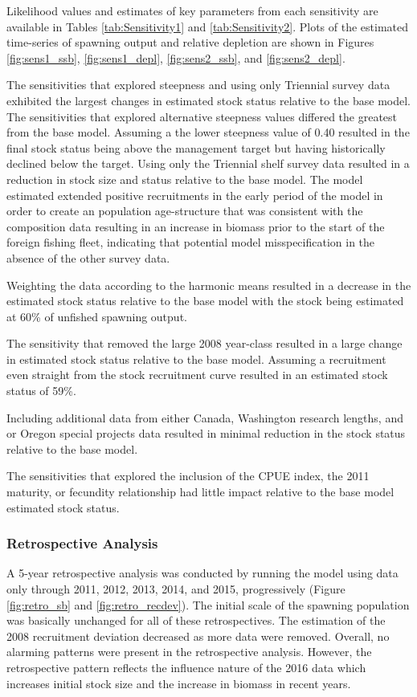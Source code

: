 \documentclass[12pt,]{article}
\begin{document}
Likelihood values and estimates of key parameters from each sensitivity
are available in Tables \ref{tab:Sensitivity1} and
\ref{tab:Sensitivity2}. Plots of the estimated time-series of spawning
output and relative depletion are shown in Figures \ref{fig:sens1_ssb},
\ref{fig:sens1_depl}, \ref{fig:sens2_ssb}, and \ref{fig:sens2_depl}.

The sensitivities that explored steepness and using only Triennial
survey data exhibited the largest changes in estimated stock status
relative to the base model. The sensitivities that explored alternative
steepness values differed the greatest from the base model. Assuming a
the lower steepness value of 0.40 resulted in the final stock status
being above the management target but having historically declined below
the target. Using only the Triennial shelf survey data resulted in a
reduction in stock size and status relative to the base model. The model
estimated extended positive recruitments in the early period of the
model in order to create an population age-structure that was consistent
with the composition data resulting in an increase in biomass prior to
the start of the foreign fishing fleet, indicating that potential model
misspecification in the absence of the other survey data.

Weighting the data according to the harmonic means resulted in a
decrease in the estimated stock status relative to the base model with
the stock being estimated at 60\% of unfished spawning output.

The sensitivity that removed the large 2008 year-class resulted in a
large change in estimated stock status relative to the base model.
Assuming a recruitment even straight from the stock recruitment curve
resulted in an estimated stock status of 59\%.

Including additional data from either Canada, Washington research
lengths, and or Oregon special projects data resulted in minimal
reduction in the stock status relative to the base model.

The sensitivities that explored the inclusion of the CPUE index, the
2011 maturity, or fecundity relationship had little impact relative to
the base model estimated stock status.

\subsubsection{Retrospective Analysis}\label{retrospective-analysis}

A 5-year retrospective analysis was conducted by running the model using
data only through 2011, 2012, 2013, 2014, and 2015, progressively
(Figure \ref{fig:retro_sb} and \ref{fig:retro_recdev}). The initial
scale of the spawning population was basically unchanged for all of
these retrospectives. The estimation of the 2008 recruitment deviation
decreased as more data were removed. Overall, no alarming patterns were
present in the retrospective analysis. However, the retrospective
pattern reflects the influence nature of the 2016 data which increases
initial stock size and the increase in biomass in recent years.
\end{document}
